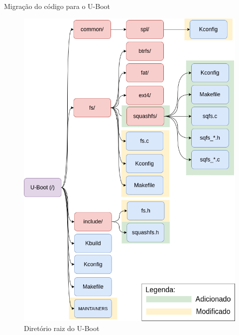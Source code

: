 \begin{frame}{Migração do código para o U-Boot}
    \begin{figure}
        \centering
        \includegraphics[scale=0.185]{figuras/uboot.png}
        \caption{Diretório raiz do U-Boot}
        \label{fig:my_label}
    \end{figure}
\end{frame}

